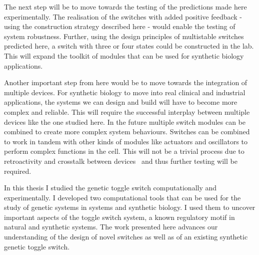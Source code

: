 The next step will be to move towards the testing of the predictions made here experimentally. The realisation of the switches with added positive feedback - using the construction strategy described here - would enable the testing of system robustness. Further, using the design principles of multistable switches predicted here, a switch with three or four states could be constructed in the lab. This will expand the toolkit of modules that can be used for synthetic biology applications. 

Another important step from here would be to move towards the integration of multiple devices. For synthetic biology to move into real clinical and industrial applications, the systems we can design and build will have to become more complex and reliable. This will require the successful interplay between multiple devices like the one studied here. In the future multiple switch modules can be combined to create more complex system behaviours. Switches can be combined to work in tandem with other kinds of modules like actuators and oscillators to perform complex functions in the cell. This will not be a trivial process due to retroactivity and crosstalk between devices~\autocite{DelVecchio:2008gy} and thus further testing will be required.


In this thesis I studied the genetic toggle switch computationally and experimentally. I developed two computational tools that can be used for the study of genetic systems in systems and synthetic biology. I used them to uncover important aspects of the toggle switch system, a known regulatory motif in natural and synthetic systems. The work presented here advances our understanding of the design of novel switches as well as of an existing synthetic genetic toggle switch.



